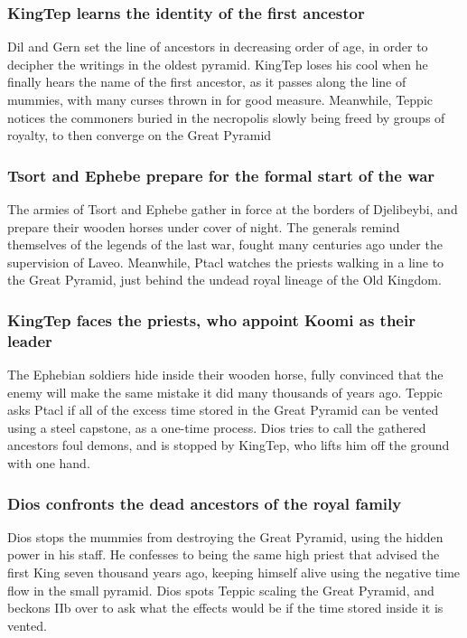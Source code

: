 \subsubsection{\Gls{KingTep} learns the identity of the first ancestor}
\Gls{Dil} and \Gls{Gern} set the line of ancestors in decreasing order of age, in order to decipher
the writings in the oldest pyramid. \Gls{KingTep} loses his cool when he finally hears the name of
the first ancestor, as it passes along the line of mummies, with many curses thrown in for good
measure. Meanwhile, \Gls{Teppic} notices the commoners buried in the necropolis slowly being freed
by groups of royalty, to then converge on the Great Pyramid

\subsubsection{Tsort and Ephebe prepare for the formal start of the war}
The armies of Tsort and Ephebe gather in force at the borders of Djelibeybi, and prepare their
wooden horses under cover of night. The generals remind themselves of the legends of the last war,
fought many centuries ago under the supervision of \Gls{Laveo}. Meanwhile, \Gls{Ptacl} watches the
priests walking in a line to the Great Pyramid, just behind the undead royal lineage of the Old
Kingdom.

\subsubsection{\Gls{KingTep} faces the priests, who appoint \Gls{Koomi} as their leader}
The Ephebian soldiers hide inside their wooden horse, fully convinced that the enemy will make the
same mistake it did many thousands of years ago. \Gls{Teppic} asks \Gls{Ptacl} if all of the excess
time stored in the Great Pyramid can be vented using a steel capstone, as a one-time process.
\Gls{Dios} tries to call the gathered ancestors foul demons, and is stopped by \Gls{KingTep}, who
lifts him off the ground with one hand.

\subsubsection{\Gls{Dios} confronts the dead ancestors of the royal family}
\Gls{Dios} stops the mummies from destroying the Great Pyramid, using the hidden power in his
staff. He confesses to being the same high priest that advised the first King seven thousand years
ago, keeping himself alive using the negative time flow in the small pyramid. \Gls{Dios} spots
\Gls{Teppic} scaling the Great Pyramid, and beckons \Gls{IIb} over to ask what the effects would be
if the time stored inside it is vented.

